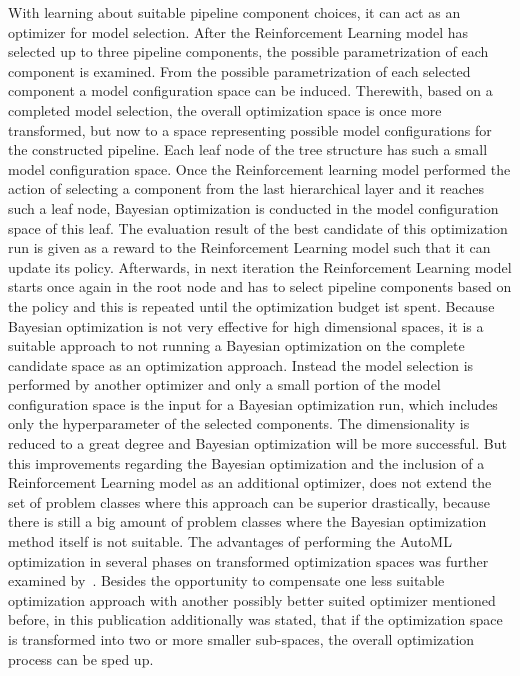 With learning about suitable pipeline component choices, it can act as an optimizer for model selection.\newline
After the Reinforcement Learning model has selected up to three pipeline components, the possible parametrization of each component is examined.
From the possible parametrization of each selected component a model configuration space can be induced.
Therewith, based on a completed model selection, the overall optimization space is once more transformed, but now to a space representing possible model configurations for the constructed pipeline.
Each leaf node of the tree structure has such a small model configuration space.\newline
Once the Reinforcement learning model performed the action of selecting a component from the last hierarchical layer and it reaches such a leaf node, Bayesian optimization is conducted in the model configuration space of this leaf.
The evaluation result of the best candidate of this optimization run is given as a reward to the Reinforcement Learning model such that it can update its policy.
Afterwards, in next iteration the Reinforcement Learning model starts once again in the root node and has to select pipeline components based on the policy and this is repeated until the optimization budget ist spent.\newline
Because Bayesian optimization is not very effective for high dimensional spaces, it is a suitable approach to not running a Bayesian optimization on the complete candidate space as an optimization approach.
Instead the model selection is performed by another optimizer and only a small portion of the model configuration space is the input for a Bayesian optimization run, which includes only the hyperparameter of the selected components.
The dimensionality is reduced to a great degree and Bayesian optimization will be more successful.\newline
But this improvements regarding the Bayesian optimization and the inclusion of a Reinforcement Learning model as an additional optimizer, does not extend the set of problem classes where this approach can be superior drastically, because there is still a big amount of problem classes where the Bayesian optimization method itself is not suitable.\newline
\newline
The advantages of performing the AutoML optimization in several phases on transformed optimization spaces was further examined by~\textcite{Quemy-Two-Stage-Optimization}.
Besides the opportunity to compensate one less suitable optimization approach with another possibly better suited optimizer mentioned before, in this publication additionally was stated, that if the optimization space is transformed into two or more smaller sub-spaces, the overall optimization process can be sped up.
